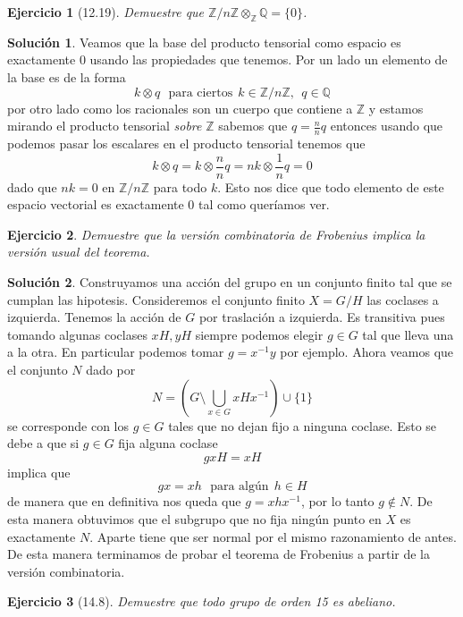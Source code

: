 \documentclass[11pt]{article}
\theoremstyle{plain}
\newtheorem*{ej}{Ejercicio}
\theoremstyle{definition}
\newtheorem*{sol}{Solución}
\theoremstyle{remark}
\newcommand\ZZ{\mathbb{Z}}
\begin{document}
\begin{tcolorbox}[colback=teal!25!white,colframe=teal!75!black]
	\begin{ej}
		[12.19] Demuestre que $\ZZ/n\ZZ \otimes_{\ZZ} \mathbb Q = \{0\}$.
	\end{ej}	
\end{tcolorbox}
\medskip

\begin{sol}
	Veamos que la base del producto tensorial como espacio es exactamente $0$ usando las propiedades que tenemos. Por un lado un elemento de la base es de la forma
	\[
	k \otimes q \ \ \ \text{para ciertos} \ \ k \in \ZZ/n\ZZ, \ \ q \in \mathbb Q
	\]
	por otro lado como los racionales son un cuerpo que contiene a $\ZZ$ y estamos mirando el producto tensorial \textit{sobre} $\ZZ$ sabemos que $q = \frac{n}{n}q$ entonces usando que podemos pasar los escalares en el producto tensorial tenemos que 
	\[
	k \otimes q = k \otimes \frac{n}{n} q = nk \otimes \frac{1}{n}q = 0
	\]
	dado que $nk = 0$ en $\ZZ/n\ZZ$ para todo $k$. Esto nos dice que todo elemento de este espacio vectorial es exactamente 0 tal como queríamos ver.
\end{sol}

\newpage
\begin{tcolorbox}[colback=teal!25!white,colframe=teal!75!black]
	\begin{ej}
		Demuestre que la versión combinatoria de Frobenius implica la versión usual del teorema.		
	\end{ej}	
\end{tcolorbox}
\medskip

\begin{sol}
Construyamos una acción del grupo en un conjunto finito tal que se cumplan las hipotesis. Consideremos el conjunto finito $X = G/H$ las coclases a izquierda. Tenemos la acción de $G$ por traslación a izquierda. Es transitiva pues tomando algunas coclases $xH, yH$ siempre podemos elegir $g \in G$ tal que lleva una a la otra. En particular podemos tomar $g=x^{-1}y$ por ejemplo. Ahora veamos que el conjunto $N$ dado por 
\[
N = (G \setminus \bigcup_{x \in G} xHx^{-1}) \cup \{1\}
\]
se corresponde con los $g \in G$ tales que no dejan fijo a ninguna coclase. Esto se debe a que si $g \in G$ fija alguna coclase
\[
gxH = xH
\]
implica que
\[
gx = xh \ \ \ \text{para algún} \ \ h \in H
\]
de manera que en definitiva nos queda que $g = xhx^{-1}$, por lo tanto $g \notin N$. De esta manera obtuvimos que el subgrupo que no fija ningún punto en $X$ es exactamente $N$. Aparte tiene que ser normal por el mismo razonamiento de antes. De esta manera terminamos de probar el teorema de Frobenius a partir de la versión combinatoria.
\end{sol}
\bigskip
\begin{tcolorbox}[colback=teal!25!white,colframe=teal!75!black]
	\begin{ej}[14.8]
		Demuestre que todo grupo de orden 15 es abeliano.
	\end{ej}	
\end{tcolorbox}
\medskip
\end{document}
